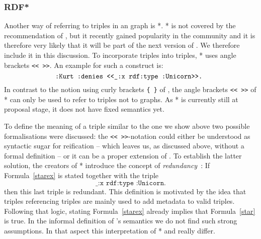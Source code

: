 \subsubsection{RDF*}
Another way of referring to \rdf triples in an \rdf graph is \rdf{}*\cite{rdfstar,rdfstarposter}. \rdf{}* is not covered by the \wwwc recommendation of \rdf, but it recently gained popularity in the community and 
it is therefore very likely that it will be part of the next version of \rdf. We therefore include it in this discussion.
To incorporate triples into triples, \rdf{}* uses angle brackets \texttt{<{}<  >{}>}. An example for such a construct is:
\begin{equation}\label{starex}
\verb!:Kurt :denies <<_:x rdf:type :Unicorn>>. !
\end{equation}
In contrast to the  notion using curly brackets \texttt{\{ \}} of \nthree, the angle brackets \texttt{<{}<  >{}>} of \rdf{}* can only be used to refer to triples not to graphs. 
As \rdf{}* is currently still at proposal stage, 
it does not have fixed semantics yet.

To define the meaning of a triple similar to the one we show above two possible formalisations were discussed: the 
\texttt{<{}<  >{}>}-notation could either  be understood as syntactic sugar for reification -- which leaves us, as discussed above, without a formal 
definition -- or it can be a proper extension of \rdf. 
To establish the latter solution, the creators of \rdf{}*  introduce the concept of \emph{redundancy}~\cite{rdfstar}: If Formula~\ref{starex} is stated together with the \rdf triple
\begin{equation}\label{star}
 \texttt{\_:x rdf:type :Unicorn.}
\end{equation}
then this last triple is redundant. This definition is motivated by the idea that triples referencing triples are mainly used to add metadata to valid triples. 
Following that logic, stating Formula~\ref{starex} already implies that Formula~\ref{star} is true. In the informal definition of \nthree's semantics we do not find such strong assumptions. 
In that aspect this interpretation of \rdf{}* and \nthree really differ. 


